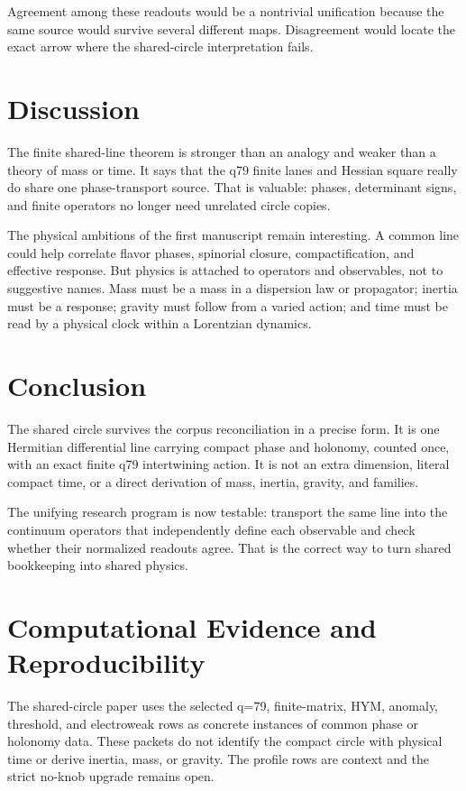 \documentclass[11pt]{article}
\begin{document}
Agreement among these readouts would be a nontrivial unification because the
same source would survive several different maps. Disagreement would locate
the exact arrow where the shared-circle interpretation fails.

\section{Discussion}

The finite shared-line theorem is stronger than an analogy and weaker than a
theory of mass or time. It says that the q79 finite lanes and Hessian square
really do share one phase-transport source. That is valuable: phases,
determinant signs, and finite operators no longer need unrelated circle
copies.

The physical ambitions of the first manuscript remain interesting. A common
line could help correlate flavor phases, spinorial closure, compactification,
and effective response. But physics is attached to operators and observables,
not to suggestive names. Mass must be a mass in a dispersion law or
propagator; inertia must be a response; gravity must follow from a varied
action; and time must be read by a physical clock within a Lorentzian
dynamics.

\section{Conclusion}

The shared circle survives the corpus reconciliation in a precise form. It is
one Hermitian differential line carrying compact phase and holonomy, counted
once, with an exact finite q79 intertwining action. It is not an extra
dimension, literal compact time, or a direct derivation of mass, inertia,
gravity, and families.

The unifying research program is now testable: transport the same line into
the continuum operators that independently define each observable and check
whether their normalized readouts agree. That is the correct way to turn
shared bookkeeping into shared physics.

\section*{Computational Evidence and Reproducibility}
The shared-circle paper uses the selected q=79, finite-matrix, HYM, anomaly, threshold, and electroweak rows as concrete instances of common phase or holonomy data. These packets do not identify the compact circle with physical time or derive inertia, mass, or gravity. The profile rows are context and the strict no-knob upgrade remains open.
\end{document}
